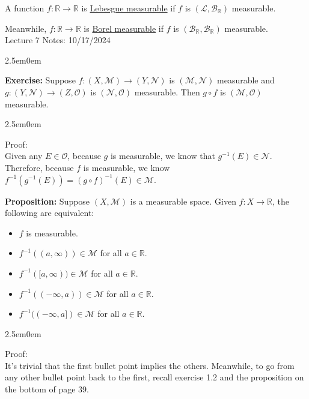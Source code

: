\documentclass{book}
\newcommand{\hTwo}{%
\color{MidnightBlue}%
   \fontsize{13}{15}\selectfont%
}
\newcommand{\hThree}{%
   \color{PineGreen!85!Orange}
   \fontsize{12}{14}\selectfont%
}
\newcommand{\exTwo}{%
   \color{Purple}%
   \fontsize{13}{15}\selectfont%
}
\newcommand{\exPP}{%
   \color{RedViolet}%
   \fontsize{12}{14}\selectfont%
}
\newenvironment{myIndent}{%
   \begin{adjustwidth}{2.5em}{0em}%
}{%
   \end{adjustwidth}%
}
\newcommand{\udefine}[1]{{%
   \setulcolor{Red}%
   \setul{0.14em}{0.07em}%
   \ul{#1}%
}}
\newcommand{\blab}[1]{\textbf{#1}}
\newcommand{\retTwo}{\hfill\bigbreak}
\newcommand{\mHeader}[1]{{
   \color{Black}%
   \fontsize{20}{18}\selectfont%
   #1\retTwo
}}
\begin{document}
A function $f: \mathbb{R} \longrightarrow \mathbb{R}$ is \udefine{Lebesgue measurable} if $f$ is $(\mathcal{L}, \mathcal{B}_\mathbb{R})$ measurable.\retTwo

Meanwhile, $f: \mathbb{R} \longrightarrow \mathbb{R}$ is \udefine{Borel measurable} if $f$ is $(\mathcal{B}_{\mathbb{R}}, \mathcal{B}_\mathbb{R})$ measurable.\\[6pt]

\mHeader{Lecture 7 Notes: 10/17/2024}

\begin{myIndent}\exTwo
   \blab{Exercise:} Suppose $f: (X, \mathcal{M}) \longrightarrow (Y, \mathcal{N})$ is $(\mathcal{M}, \mathcal{N})$ measurable and\\ $g: (Y, \mathcal{N}) \longrightarrow (Z, \mathcal{O})$ is $(\mathcal{N}, \mathcal{O})$ measurable. Then $g \circ f$ is $(\mathcal{M}, \mathcal{O})$ measurable.

   \begin{myIndent}
      \exPP Proof:\\
      Given any $E \in \mathcal{O}$, because $g$ is measurable, we know that $g^{-1}(E) \in \mathcal{N}$. Therefore, because $f$ is measurable, we know $f^{-1}(g^{-1}(E)) = (g \circ f)^{-1}(E) \in \mathcal{M}$.\retTwo
   \end{myIndent}

   \hTwo\blab{Proposition:} Suppose $(X, \mathcal{M})$ is a measurable space. Given $f: X \longrightarrow \mathbb{R}$, the following are equivalent:
   \begin{itemize}
      \item $f$ is measurable.
      \item $f^{-1}((a, \infty)) \in \mathcal{M}$ for all $a \in \mathbb{R}$.
      \item $f^{-1}([a, \infty)) \in \mathcal{M}$ for all $a \in \mathbb{R}$.
      \item $f^{-1}((-\infty, a)) \in \mathcal{M}$ for all $a \in \mathbb{R}$.
      \item $f^{-1}((-\infty, a]) \in \mathcal{M}$ for all $a \in \mathbb{R}$.\retTwo
   \end{itemize}

   \begin{myIndent}\hThree
      Proof:\\
      It's trivial that the first bullet point implies the others. Meanwhile, to go from any other bullet point back to the first, recall exercise 1.2 and the proposition on the bottom of page 39.\retTwo
   \end{myIndent}\retTwo
\end{myIndent}
\end{document}
